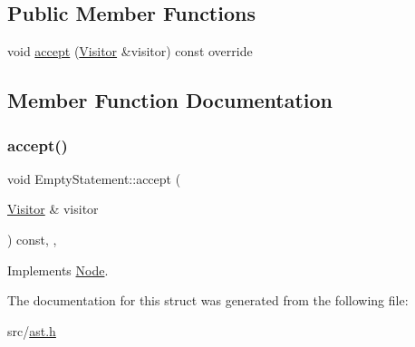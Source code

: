 \subsection*{Public Member Functions}
\begin{DoxyCompactItemize}
\item 
void \hyperlink{struct_empty_statement_af0d920224b9b982402a3a72030d49eed}{accept} (\hyperlink{struct_visitor}{Visitor} \&visitor) const override
\end{DoxyCompactItemize}


\subsection{Member Function Documentation}
\mbox{\label{struct_empty_statement_af0d920224b9b982402a3a72030d49eed}} 
\subsubsection{\texorpdfstring{accept()}{accept()}}
{\footnotesize\ttfamily void Empty\+Statement\+::accept (\begin{DoxyParamCaption}\item[{\hyperlink{struct_visitor}{Visitor} \&}]{visitor }\end{DoxyParamCaption}) const\hspace{0.3cm}{\ttfamily [inline]}, {\ttfamily [override]}, {\ttfamily [virtual]}}



Implements \hyperlink{struct_node_a10bd7af968140bbf5fa461298a969c71}{Node}.



The documentation for this struct was generated from the following file\+:\begin{DoxyCompactItemize}
\item 
src/\hyperlink{ast_8h}{ast.\+h}\end{DoxyCompactItemize}
